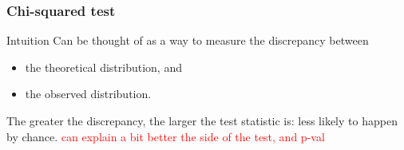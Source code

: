 \documentclass[compress, notes=hide]{beamer}
\newcommand{\hl}[1]{\textbf{#1}}
\begin{document}
\begin{frame}
	\frametitle{Chi-squared test}
	\begin{block}{Intuition}
		Can be thought of as a way to measure the discrepancy between
		\begin{itemize}
			\item the theoretical distribution, and
			\item the observed distribution.
		\end{itemize}
	The greater the discrepancy, the larger the test statistic is: less likely to happen by chance. \textcolor{red}{can explain a bit better the side of the test, and p-val}
	\end{block}
\end{frame}



%		




\end{document}
